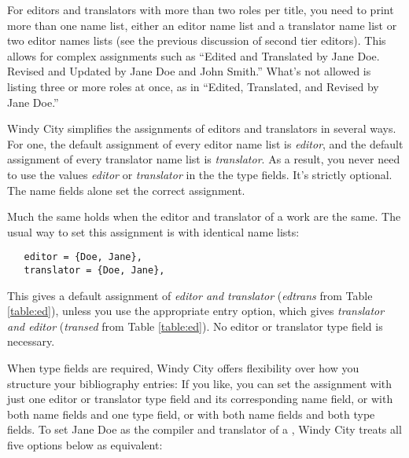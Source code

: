 \documentclass[11pt,letterpaper,oneside]{article}
\begin{document}
For editors and translators with more than two roles per title, you
need to print more than one name list, either an editor name list and
a translator name list or two editor names lists (see the previous
discussion of second tier editors). This allows for complex
assignments such as ``Edited and Translated by Jane Doe. Revised and
Updated by Jane Doe and John Smith.'' What's not allowed is listing
three or more roles at once, as in ``Edited, Translated, and Revised
by Jane Doe.''

Windy City simplifies the assignments of editors and translators in
several ways. For one, the default assignment of every editor name
list is \textit{editor}, and the default assignment of every
translator name list is \textit{translator}. As a result, you never
need to use the values \textit{editor} or \textit{translator} in the
the type fields. It's strictly optional. The name fields alone set the
correct assignment.

Much the same holds when the editor and translator of a work are the
same. The usual way to set this assignment is with identical name
lists:

\begin{verbatim}
   editor = {Doe, Jane},
   translator = {Doe, Jane},
\end{verbatim}

\noindent This gives a default assignment of \textit{editor and
translator} (\textit{edtrans} from Table \ref{table:ed}), unless you
use the appropriate  entry option, which gives
\textit{translator and editor} (\textit{transed} from Table
\ref{table:ed}). No editor or translator type field is necessary.

When type fields are required, Windy City offers flexibility over how
you structure your bibliography entries: If you like, you can set the
assignment with just one editor or translator type field and its
corresponding name field, or with both name fields and one type field,
or with both name fields and both type fields. To set Jane Doe as the
compiler and translator of a , Windy City treats all
five options below as equivalent:
\end{document}
